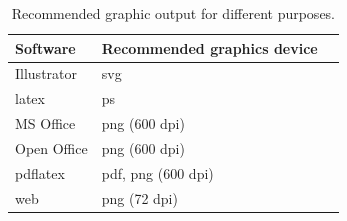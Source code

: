 \begin{table}
  \begin{center}
  \begin{tabular}{lll}
    \toprule
    Software & Recommended graphics device \\
    \midrule
    Illustrator & svg \\
    latex & ps \\
    MS Office & png (600 dpi) \\
    Open Office & png (600 dpi) \\
    pdflatex & pdf, png (600 dpi) \\
    web & png (72 dpi) \\
    \bottomrule 
  \end{tabular}
  \end{center}
  \caption{Recommended graphic output for different purposes.}
  \label{tbl:graphic-recommendation}
\end{table}



